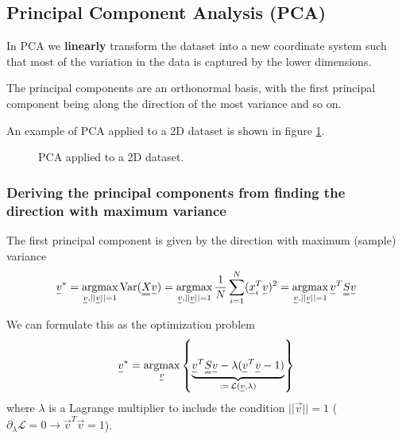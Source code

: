 \subsection{Principal Component Analysis (PCA)}
In PCA we \textbf{linearly} transform the dataset into a new coordinate system such that
most of the variation in the data is captured by the lower dimensions.

The principal components are an orthonormal basis, with the first principal component
being along the direction of the most variance and so on.

An example of PCA applied to a 2D dataset is shown in figure \ref{fig:pca}.

\begin{figure}[!htb]
    \centering
    
    \caption{PCA applied to a 2D dataset.}
    \label{fig:pca}
\end{figure}

\subsubsection{Deriving the principal components from finding the direction with maximum variance}

The first principal component is given by the direction with maximum (sample) variance
\begin{equation}
    \vec{v}^* = \argmax_{\vec{v}, ||\vec{v}|| = 1} \Var(\mat{X}\vec{v}) = \argmax_{\vec{v}, ||\vec{v}|| = 1} \frac{1}{N} \sum_{i=1}^{N} (\vec{x}_i^T \vec{v})^2 = \argmax_{\vec{v}, ||\vec{v}|| = 1} \vec{v}^T \mat{S} \vec{v}
\end{equation}

We can formulate this as the optimization problem
\begin{equation}
    \vec{v}^* = \argmax_{\vec{v}} \left\{ \underbrace{\vec{v}^T \mat{S} \vec{v} - \lambda (\vec{v}^T \vec{v} - 1)}_{:=\,\mathcal{L}(\vec{v},\lambda)} \right\}
\end{equation}
where $\lambda$ is a Lagrange multiplier to include the condition $||\vec{v}|| = 1$ ($\partial_{\lambda} \mathcal{L} = 0
\rightarrow \vec{v}^T \vec{v} = 1$).


